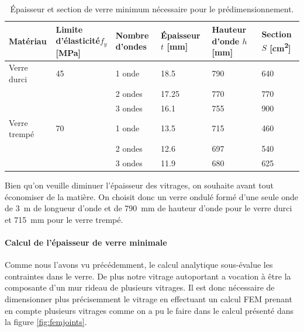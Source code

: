 \documentclass[11pt,titlepage]{article}
\begin{document}
\begin{table}[H]
\centering
\caption{Épaisseur et section de verre minimum nécessaire pour le prédimensionnement.}
\label{tab:mat_predimsin}
\begin{tabularx}{\textwidth}{l*{5}{Y}}
\toprule
\textbf{Matériau} & \textbf{Limite d'élasticité}$f_y$ [\unit{\mega\pascal}] &\textbf{Nombre d'ondes} & \textbf{Épaisseur} $t$ [\unit{\milli\metre}]& \textbf{Hauteur d'onde} $h$ [\unit{\milli\metre}] & \textbf{Section} $S$ [\unit{\square\centi\meter}] \\\midrule
Verre durci & 45 & 1 onde & 18.5 &790& 640 \\
 & & 2 ondes & 17.25 &770& 770 \\
 & & 3 ondes & 16.1 & 755&900 \\
Verre trempé & 70 & 1 onde & 13.5 &715& 460 \\
 & & 2 ondes & 12.6 & 697&540 \\
 & & 3 ondes & 11.9 & 680&625 \\
\bottomrule
\end{tabularx}
\end{table}
Bien qu'on veuille diminuer l'épaisseur des vitrages, on souhaite avant tout économiser de la matière. On choisit donc un verre ondulé formé d'une seule onde de \qty{3}{\metre} de longueur d'onde et de \qty{790}{\milli\metre} de hauteur d'onde pour le verre durci et \qty{715}{\milli\metre} pour le verre trempé.

\paragraph{Calcul de l'épaisseur de verre minimale}\mbox{}

Comme nous l'avons vu précédemment, le calcul analytique sous-évalue les contraintes dans le verre. De plus notre vitrage autoportant a vocation à être la composante d'un mur rideau de plusieurs vitrages. Il est donc nécessaire de dimensionner plus précisemment le vitrage en effectuant un calcul \acrshort{FEM} prenant en compte plusieurs vitrages comme on a pu le faire dans le calcul présenté dans la figure \ref{fig:femjoints}.
\end{document}
